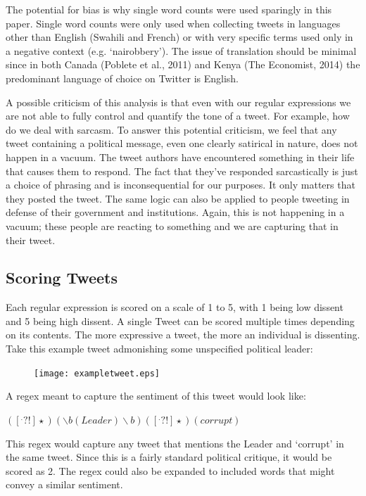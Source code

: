 \documentclass[12pt]{article}
\begin{document}
\begin{spacing}{1.5}
The potential for bias is why single word counts were used sparingly in this paper. Single word counts were only used when collecting tweets in languages other than English (Swahili and French) or with very specific terms used only in a negative context (e.g. `nairobbery'). The issue of translation should be minimal since in both Canada (Poblete et al., 2011) and Kenya (The Economist, 2014) the predominant language of choice on Twitter is English. 

A possible criticism of this analysis is that even with our regular expressions we are not able to fully control and quantify the tone of a tweet. For example, how do we deal with sarcasm. To answer this potential criticism, we feel that any tweet containing a political message, even one clearly satirical in nature, does not happen in a vacuum. The tweet authors have encountered something in their life that causes them to respond. The fact that they've responded sarcastically is just a choice of phrasing and is inconsequential for our purposes. It only matters that they posted the tweet. The same logic can also be applied to people tweeting in defense of their government and institutions. Again, this is not happening in a vacuum; these people are reacting to something and we are capturing that in their tweet.

\subsection*{Scoring Tweets}

Each regular expression is scored on a scale of 1 to 5, with 1 being low dissent and 5 being high dissent. A single Tweet can be scored multiple times depending on its contents. The more expressive a tweet, the more an individual is dissenting. Take this example tweet admonishing some unspecified political leader: 

\vspace{.5 em}

\begin{figure}[htb]
\centering 
\texttt{[image: exampletweet.eps]} 
\end{figure}
     
\noindent A regex meant to capture the sentiment of this tweet would look like:

\begin{center}
$([^.?!]\star)(\backslash b(Leader)\backslash b)([^.?!]\star)(corrupt)$
\end{center}

\noindent This regex would capture any tweet that mentions the Leader and ‘corrupt’ in the same tweet. Since this is a fairly standard political critique, it would
be scored as 2. The regex could also be expanded to included words that
might convey a similar sentiment.


\end{spacing}
\end{document}
